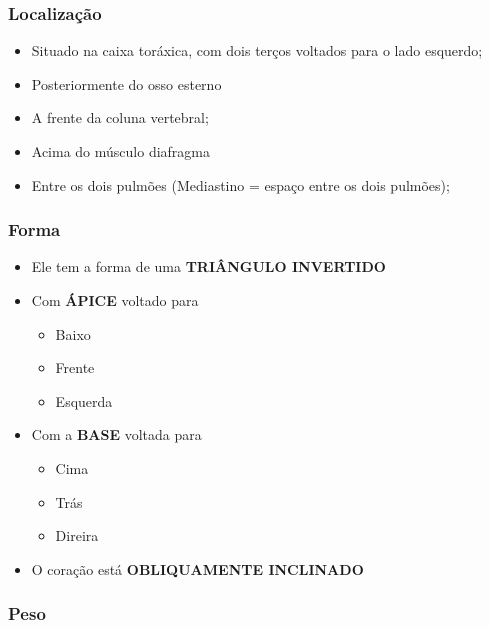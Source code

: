\documentclass[
]{book}
\providecommand{\tightlist}{%
  \setlength{\itemsep}{0pt}\setlength{\parskip}{0pt}}
\begin{document}
\hypertarget{localizauxe7uxe3o}{%
\subsubsection{Localização}\label{localizauxe7uxe3o}}

\begin{itemize}
\tightlist
\item
  Situado na caixa toráxica, com dois terços voltados para o lado esquerdo;
\item
  Posteriormente do osso esterno
\item
  A frente da coluna vertebral;
\item
  Acima do músculo diafragma
\item
  Entre os dois pulmões (Mediastino = espaço entre os dois pulmões);
\end{itemize}

\hypertarget{forma}{%
\subsubsection{Forma}\label{forma}}

\begin{itemize}
\tightlist
\item
  Ele tem a forma de uma \textbf{TRIÂNGULO INVERTIDO}
\item
  Com \textbf{ÁPICE} voltado para

  \begin{itemize}
  \tightlist
  \item
    Baixo
  \item
    Frente
  \item
    Esquerda
  \end{itemize}
\item
  Com a \textbf{BASE} voltada para

  \begin{itemize}
  \tightlist
  \item
    Cima
  \item
    Trás
  \item
    Direira
  \end{itemize}
\item
  O coração está \textbf{OBLIQUAMENTE INCLINADO}
\end{itemize}

\hypertarget{peso}{%
\subsubsection{Peso}\label{peso}}
\end{document}
